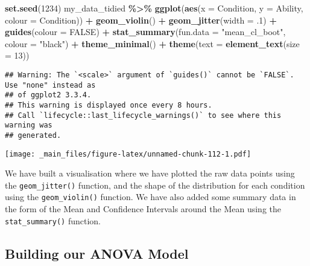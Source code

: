 \documentclass[
]{book}
\newenvironment{Shaded}{\begin{snugshade}}{\end{snugshade}}
\newcommand{\AttributeTok}[1]{\textcolor[rgb]{0.13,0.29,0.53}{#1}}
\newcommand{\ConstantTok}[1]{\textcolor[rgb]{0.56,0.35,0.01}{#1}}
\newcommand{\DecValTok}[1]{\textcolor[rgb]{0.00,0.00,0.81}{#1}}
\newcommand{\FunctionTok}[1]{\textcolor[rgb]{0.13,0.29,0.53}{\textbf{#1}}}
\newcommand{\NormalTok}[1]{#1}
\newcommand{\SpecialCharTok}[1]{\textcolor[rgb]{0.81,0.36,0.00}{\textbf{#1}}}
\newcommand{\StringTok}[1]{\textcolor[rgb]{0.31,0.60,0.02}{#1}}
\begin{document}
\begin{Shaded}
\begin{Highlighting}[]
\FunctionTok{set.seed}\NormalTok{(}\DecValTok{1234}\NormalTok{)}
\NormalTok{my\_data\_tidied }\SpecialCharTok{\%\textgreater{}\%} 
  \FunctionTok{ggplot}\NormalTok{(}\FunctionTok{aes}\NormalTok{(}\AttributeTok{x =}\NormalTok{ Condition, }\AttributeTok{y =}\NormalTok{ Ability, }\AttributeTok{colour =}\NormalTok{ Condition)) }\SpecialCharTok{+}
  \FunctionTok{geom\_violin}\NormalTok{() }\SpecialCharTok{+}
  \FunctionTok{geom\_jitter}\NormalTok{(}\AttributeTok{width =}\NormalTok{ .}\DecValTok{1}\NormalTok{) }\SpecialCharTok{+}
  \FunctionTok{guides}\NormalTok{(}\AttributeTok{colour =} \ConstantTok{FALSE}\NormalTok{) }\SpecialCharTok{+}
  \FunctionTok{stat\_summary}\NormalTok{(}\AttributeTok{fun.data =} \StringTok{"mean\_cl\_boot"}\NormalTok{, }\AttributeTok{colour =} \StringTok{"black"}\NormalTok{) }\SpecialCharTok{+}
  \FunctionTok{theme\_minimal}\NormalTok{() }\SpecialCharTok{+}
  \FunctionTok{theme}\NormalTok{(}\AttributeTok{text =} \FunctionTok{element\_text}\NormalTok{(}\AttributeTok{size =} \DecValTok{13}\NormalTok{)) }
\end{Highlighting}
\end{Shaded}

\begin{verbatim}
## Warning: The `<scale>` argument of `guides()` cannot be `FALSE`. Use "none" instead as
## of ggplot2 3.3.4.
## This warning is displayed once every 8 hours.
## Call `lifecycle::last_lifecycle_warnings()` to see where this warning was
## generated.
\end{verbatim}

\texttt{[image: \_main\_files/figure-latex/unnamed-chunk-112-1.pdf]}

We have built a visualisation where we have plotted the raw data points using the \texttt{geom\_jitter()} function, and the shape of the distribution for each condition using the \texttt{geom\_violin()} function. We have also added some summary data in the form of the Mean and Confidence Intervals around the Mean using the \texttt{stat\_summary()} function.

\hypertarget{building-our-anova-model}{%
\subsection{Building our ANOVA Model}\label{building-our-anova-model}}
\end{document}
